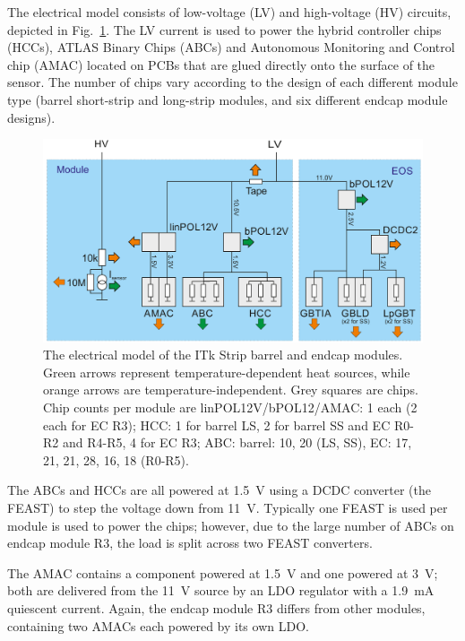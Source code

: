 
The electrical model consists of low-voltage (LV) and high-voltage (HV) circuits, depicted in
Fig.~\ref{electrical_model}. The LV current is used to power the hybrid controller chips (HCCs),
ATLAS Binary Chips (ABCs) and Autonomous Monitoring and Control chip (AMAC) located on PCBs that are
glued directly onto the surface of the sensor. The number of chips vary according to the design of
each different module type (barrel short-strip and long-strip modules, and six different endcap
module designs).

\begin{figure}[ht!]
\centering
\includegraphics[width=0.8\linewidth]{figures/electrical_model.pdf}
\caption{
The electrical model of the ITk Strip barrel and endcap modules. Green arrows represent temperature-dependent heat sources, while orange arrows are temperature-independent. Grey squares are chips. Chip counts per module are linPOL12V/bPOL12/AMAC: 1 each (2 each for EC R3); HCC: 1 for barrel LS, 2 for barrel SS and EC R0-R2 and R4-R5, 4 for EC R3; ABC: barrel: 10, 20 (LS, SS), EC: 17, 21, 21, 28, 16, 18 (R0-R5).
}
\label{electrical_model}
\end{figure}

The ABCs and HCCs are all powered at 1.5~V using a DCDC converter (the FEAST) to step the voltage down
from 11~V. Typically one FEAST is used per module is used to power the chips; however, due to the large
number of ABCs on endcap module R3, the load is split across two FEAST converters.

The AMAC contains a component powered at 1.5~V and one powered at 3~V; both are delivered from the
11~V source by an LDO regulator with a 1.9~mA quiescent current.
Again, the endcap module R3 differs from other modules, containing two AMACs each powered by its own
LDO.

